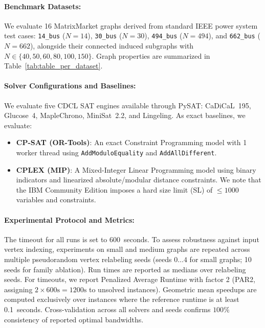 \documentclass[a4paper,fleqn]{cas-sc}
\begin{document}
\paragraph{Benchmark Datasets:}
We evaluate 16 MatrixMarket graphs derived from standard IEEE power system test cases: \texttt{14\_bus} ($N=14$), \texttt{30\_bus} ($N=30$), \texttt{494\_bus} ($N=494$), and \texttt{662\_bus} ($N=662$), alongside their connected induced subgraphs with $N \in \{40, 50, 60, 80, 100, 150\}$. Graph properties are summarized in Table~\ref{tab:table_per_dataset}.

\paragraph{Solver Configurations and Baselines:}
We evaluate five CDCL SAT engines available through PySAT: CaDiCaL~195, Glucose~4, MapleChrono, MiniSat~2.2, and Lingeling. As exact baselines, we evaluate:
\begin{itemize}
    \item \textbf{CP-SAT (OR-Tools)}: An exact Constraint Programming model with 1 worker thread using \texttt{AddModuloEquality} and \texttt{AddAllDifferent}.
    \item \textbf{CPLEX (MIP)}: A Mixed-Integer Linear Programming model using binary indicators and linearized absolute/modular distance constraints. We note that the IBM Community Edition imposes a hard size limit (SL) of $\le 1000$ variables and constraints.
\end{itemize}

\paragraph{Experimental Protocol and Metrics:}
The timeout for all runs is set to 600~seconds. To assess robustness against input vertex indexing, experiments on small and medium graphs are repeated across multiple pseudorandom vertex relabeling seeds (seeds $0\dots4$ for small graphs; 10 seeds for family ablation). Run times are reported as medians over relabeling seeds. For timeouts, we report Penalized Average Runtime with factor 2 (PAR2, assigning $2 \times 600\text{s} = 1200\text{s}$ to unsolved instances). Geometric mean speedups are computed exclusively over instances where the reference runtime is at least 0.1~seconds. Cross-validation across all solvers and seeds confirms $100\%$ consistency of reported optimal bandwidths.
\end{document}
